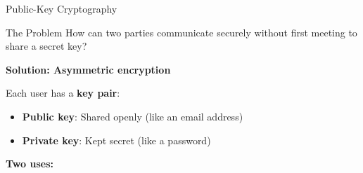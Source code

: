 \documentclass[10pt]{beamer}
\newcommand{\highlight}[1]{\textcolor{AccentOrange}{\textbf{#1}}}
\begin{document}
\begin{frame}{Public-Key Cryptography}
  \begin{block}{The Problem}
    How can two parties communicate securely without first meeting to share a secret key?
  \end{block}
  
  \vspace{0.5em}
  \textbf{Solution: Asymmetric encryption}
  
  Each user has a \highlight{key pair}:
  \begin{itemize}
    \item \textbf{Public key}: Shared openly (like an email address)
    \item \textbf{Private key}: Kept secret (like a password)
  \end{itemize}
  
  \vspace{1em}
  \textbf{Two uses:}
    \vspace{-1.5em}
  \begin{center}
  \end{center}
\end{frame}
\end{document}
